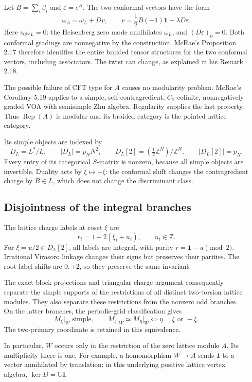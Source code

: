 \documentclass[11pt,a4paper]{article}
\numberwithin{equation}{section}
\theoremstyle{definition}\newtheorem{definition}[theorem]{Definition}
\theoremstyle{remark}\newtheorem{remark}[theorem]{Remark}
\newcommand{\C}{\mathbb C}\newcommand{\Z}{\mathbb Z}\newcommand{\Q}{\mathbb Q}
\newcommand{\one}{\mathbf1}\newcommand{\B}{\mathcal B}\newcommand{\W}{W_N}
\newcommand{\Rep}{\operatorname{Rep}}\newcommand{\Ext}{\operatorname{Ext}}
\newcommand{\eps}{\varepsilon}\newcommand{\NN}{\mathbb Z_{\geq0}}
\newcommand{\parityrank}{p_N}
\begin{document}
Let \(B=\sum_i\beta_i\) and \(\eps=e^B\). The two conformal vectors
have the form
\[
 \omega_A=\omega_L+Dv,\qquad
 v=\frac12B(-1)\one+\lambda D\eps .
\]
Here \(v_0\omega_L=0\): the Heisenberg zero mode annihilates
\(\omega_L\), and \((D\eps)_0=0\). Both conformal gradings are
nonnegative by the construction. McRae's Proposition 2.17
\cite{mcrae} therefore identifies the entire braided tensor
structures for the two conformal vectors, including associators.
The twist can change, as explained in his Remark 2.18.

The possible failure of CFT type for \(A\) causes no modularity
problem. McRae's Corollary 5.19 applies to a simple,
self-contragredient, \(C_2\)-cofinite, nonnegatively graded VOA
with semisimple Zhu algebra. Regularity supplies the last property.
Thus \(\Rep(A)\) is modular and its braided category is the
pointed lattice category.

Its simple objects are indexed by
\[
 D_L=L^*/L,\qquad |D_L|=\parityrank N^2,\qquad
 D_L[2]=(\tfrac12\Z^N)/\Z^N,\qquad |D_L[2]|=\parityrank.
\]
Every entry of its categorical $S$-matrix is nonzero, because all
simple objects are invertible. Duality acts by $\xi\mapsto-\xi$:
the conformal shift changes the contragredient charge by $B\in L$,
which does not change the discriminant class.

\subsection{Disjointness of the integral branches}

The lattice charge labels at coset \(\xi\) are
\[
                    r_i=1-2(\xi_i+n_i),\qquad n_i\in\Z.
\]
For \(\xi=u/2\in D_L[2]\), all labels are integral, with parity
\(r=\one-u\pmod2\). Irrational Virasoro linkage changes their signs
but preserves their parities. The root label shifts are \(0,\pm2\),
so they preserve the same invariant.

The exact block projections and triangular charge
argument consequently separate the simple supports of the
restrictions of all distinct two-torsion lattice modules. They
also separate these restrictions from the nonzero odd branches.
On the latter branches, the periodic-grid classification gives
\[
 M_\xi\big|_W\text{ simple},\qquad
 M_\xi\big|_W\simeq M_\eta\big|_W
       \Longleftrightarrow \eta=\xi\text{ or }-\xi.
\]
The two-primary coordinate is retained in this equivalence.

In particular, \(W\) occurs only in the restriction of the zero
lattice module \(A\). Its multiplicity there is one. For example,
a homomorphism \(W\to A\) sends \(\one\) to a vector annihilated by
translation; in this underlying positive lattice vertex algebra,
\(\ker D=\C\one\).
\end{document}

